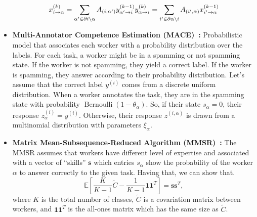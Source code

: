 \begin{itemize}
\begin{equation}
        x_{i \rightarrow \alpha}^{(k)} = \sum_{\alpha' \in \partial i \backslash \alpha} A_{(i, \alpha')} y_{\alpha' \rightarrow i}^{(k-1)} \\
        y_{\alpha \rightarrow i}^{(k)} = \sum_{i' \in \partial \alpha \backslash i} A_{(i',\alpha)} x_{i' \rightarrow \alpha}^{(k-1)}
    \end{equation}
    \item \textbf{Multi-Annotator Competence Estimation (MACE)~\cite{hovy_MACE_2013,crowdkit_webpage_documentation}:}
    Probabilistic model that associates each worker with a probability distribution over the labels. For each task, a worker might be in a spamming or not spamming state. If the worker is not spamming, they yield a correct label. If the worker is spamming, they answer according to their probability distribution. Let's assume that the correct label $y^{(i)}$ comes from a discrete uniform distribution. When a worker annotates the task, they are in the spamming state with probability $\operatorname{Bernoulli}(1 - \theta_{\alpha})$. So, if their state $s_{\alpha} = 0$, their response $z^{(i)}_{\alpha} = y^{(i)}$. Otherwise, their response $z^{(i,\alpha)}$ is drawn from a multinomial distribution with parameters $\xi_{\alpha}$.
    \item \textbf{Matrix Mean-Subsequence-Reduced Algorithm (MMSR)~\cite{ma_Adversarial_2020,crowdkit_webpage_documentation}:} The MMSR assumes that workers have different level of expertise and associated with a vector of ``skills'' $\boldsymbol{s}$ which entries $s_{\alpha}$ show the probability of the worker $\alpha$ to answer correctly to the given task. Having that, we can show that.
    \begin{equation}
        \mathbb{E}\left[\frac{K}{K-1}\widetilde{C}-\frac{1}{K-1}\boldsymbol{1}\boldsymbol{1}^T\right]
        = \boldsymbol{s}\boldsymbol{s}^T,
    \end{equation}
    where $K$ is the total number of classes, $\widetilde{C}$ is a covariation matrix between workers, and $\boldsymbol{1}\boldsymbol{1}^T$ is the all-ones matrix which has the same size as $\widetilde{C}$.


\end{itemize}

